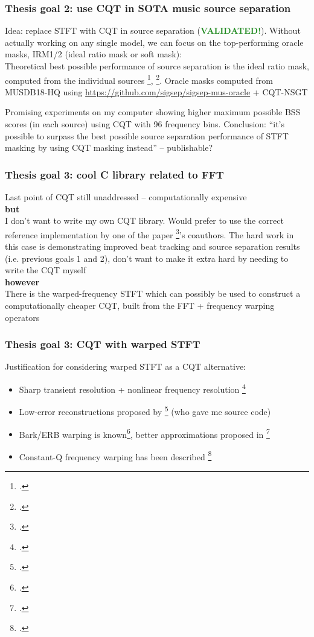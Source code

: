 \documentclass[usenames,dvipsnames]{beamer}
\begin{document}
\begin{frame}
	\frametitle{Thesis goal 2: use CQT in SOTA music source separation}
	Idea: replace STFT with CQT in source separation (\textcolor{ForestGreen}{\textbf{VALIDATED!}}). Without actually working on any single model, we can focus on the top-performing oracle masks, IRM1/2 (ideal ratio mask or soft mask):\\
	Theoretical best possible performance of source separation is the ideal ratio mask, computed from the individual sources \footcite{irm}, \footcite{sigsep2018}. Oracle masks computed from MUSDB18-HQ using \href{https://github.com/sigsep/sigsep-mus-oracle}{https://github.com/sigsep/sigsep-mus-oracle} + CQT-NSGT\\

	\vspace{1em}

	Promising experiments on my computer showing higher maximum possible BSS scores (in each source) using CQT with 96 frequency bins. Conclusion: ``it's possible to surpass the best possible source separation performance of STFT masking by using CQT masking instead'' -- publishable? 
\end{frame}

\begin{frame}
	\frametitle{Thesis goal 3: cool C library related to FFT}
	Last point of CQT still unaddressed -- computationally expensive\\
	\vspace{1em}
	\textbf{but}\\
	I don't want to write my own CQT library. Would prefer to use the correct reference implementation by one of the paper \footcite{invertiblecqt}'s coauthors. The hard work in this case is demonstrating improved beat tracking and source separation results (i.e. previous goals 1 and 2), don't want to make it extra hard by needing to write the CQT myself\\
	\vspace{1em}
	\textbf{however}\\
	There is the warped-frequency STFT which can possibly be used to construct a computationally cheaper CQT, built from the FFT + frequency warping operators
\end{frame}

\begin{frame}
	\frametitle{Thesis goal 3: CQT with warped STFT}
	Justification for considering warped STFT as a CQT alternative:
	\begin{itemize}
		\item
			Sharp transient resolution + nonlinear frequency resolution \footcite{warpwabnik}
		\item
			Low-error reconstructions proposed by \footcite{makur2008} (who gave me source code)
		\item
			Bark/ERB warping is known\footcite{barkerb}, better approximations proposed in \footcite{betterwarp}
		\item
			Constant-Q frequency warping has been described \footcite{cqwarp}
	\end{itemize}
\end{frame}
\end{document}

